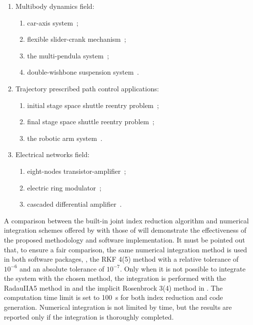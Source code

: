 \begin{enumerate}
  \setlength\itemsep{0.0em}
  \item Multibody dynamics field:
  \begin{enumerate}
    \setlength\itemsep{0.0em}
    \item car-axis system~\cite{lioen1998test, mazzia2008test};
    \item flexible slider-crank mechanism~\cite{lioen1998test, mazzia2008test};
    \item the multi-pendula system~\cite{nedialkov2008solvingIII};
    \item double-wishbone suspension system~\cite{lioen1998test, mazzia2008test}.
  \end{enumerate}
  \item Trajectory prescribed path control applications:
  \begin{enumerate}
    \setlength\itemsep{0.0em}
    \item initial stage space shuttle reentry problem~\cite{brenan1995numerical};
    \item final stage space shuttle reentry problem~\cite{brenan1995numerical};
    \item the robotic arm system~\cite{pryce1998solving}.
  \end{enumerate}
  \item Electrical networks field:
  \begin{enumerate}
    \setlength\itemsep{0.0em}
    \item eight-nodes transistor-amplifier~\cite{lioen1998test, mazzia2008test};
    \item electric ring modulator~\cite{lioen1998test, mazzia2008test};
    \item cascaded differential amplifier~\cite{brenan1995numerical}.
  \end{enumerate}
\end{enumerate}

A comparison between the built-in joint index reduction algorithm and numerical integration schemes offered by \Maple{} with those of \Indigo{} will demonstrate the effectiveness of the proposed methodology and software implementation. It must be pointed out that, to ensure a fair comparison, the same numerical integration method is used in both software packages, \ie{}, the \ac{RKF} 4(5) method with a relative tolerance of $10^{-6}$ and an absolute tolerance of $10^{-7}$. Only when it is not possible to integrate the system with the chosen method, the integration is performed with the RadauIIA5 method in \Indigo{} and the implicit Rosenbrock 3(4) method in \Maple{}. The computation time limit is set to \SI{100}{\second} for both index reduction and code generation. Numerical integration is not limited by time, but the results are reported only if the integration is thoroughly completed.

